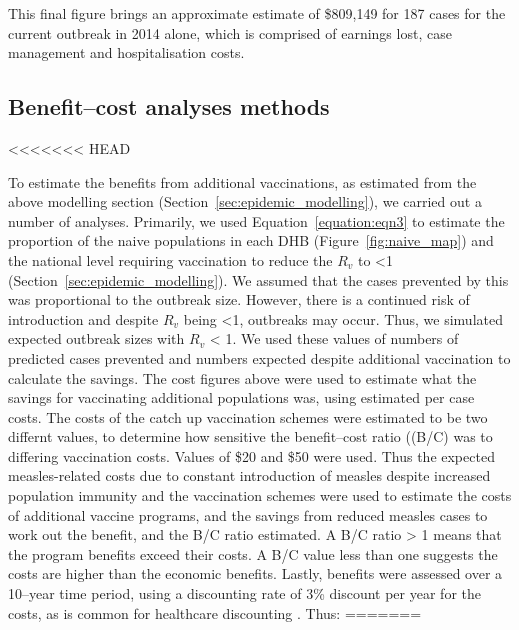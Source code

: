 \documentclass{article}
\begin{document}
\begin{itemize}
This final figure brings an approximate estimate of \$809,149 for 187 cases for the current outbreak in 2014 alone, which is comprised of earnings lost, case management and hospitalisation costs.

\subsection{Benefit--cost analyses methods}
<<<<<<< HEAD
\label{sub:cost_benefit}

To estimate the benefits from additional vaccinations, as estimated from the above modelling section (Section~\ref{sec:epidemic_modelling}), we carried out a number of analyses. Primarily, we used Equation~\ref{equation:eqn3} to estimate the proportion of the naive populations in each DHB (Figure~\ref{fig:naive_map}) and the national level requiring vaccination to reduce the $R_v$ to <1 (Section~\ref{sec:epidemic_modelling}). We assumed that the cases prevented by this was proportional to the outbreak size. However, there is a continued risk of introduction and despite $R_v$ being <1, outbreaks may occur. Thus, we simulated expected outbreak sizes with $R_v$ < 1. We used these values of numbers of predicted cases prevented and numbers expected despite additional vaccination to calculate the savings. The cost figures above were used to estimate what the savings for vaccinating additional populations was, using estimated per case costs. The costs of the catch up vaccination schemes were estimated to be two differnt values, to determine how sensitive the benefit--cost ratio ((B/C) was to differing vaccination costs. Values of \$20 and \$50 were used. Thus the expected measles-related costs due to constant introduction of measles despite increased population immunity and the vaccination schemes were used to estimate the costs of additional vaccine programs, and the savings from reduced measles cases to work out the benefit, and the B/C ratio estimated. A B/C ratio > 1 means that the program benefits exceed their costs. A B/C value less than one suggests the costs are higher than the economic benefits. Lastly, benefits were assessed over a 10--year time period, using a discounting rate of 3\% discount per year for the costs, as is common for healthcare discounting \citep{honeycutt6}. Thus:
=======

\end{itemize}
\end{document}
